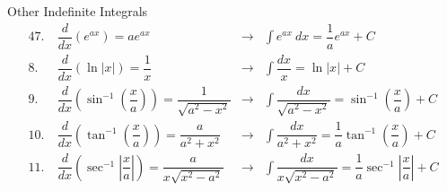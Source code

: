\documentclass[cal1spr16Lectures.tex]{subfiles}
\begin{document}
\begin{frame}{\small Other Indefinite Integrals}\footnotesize
\begin{alignat*}{4}
7.\ &\dfrac{d}{dx} (e^{ax}) = a e^{ax} &\longrightarrow &\int e^{ax}\ dx = \dfrac{1}{a} e^{ax} + C \\
8.\ &\dfrac{d}{dx} (\ln |x|) = \dfrac{1}{x} &\longrightarrow &\int \dfrac{dx}{x} = \ln |x| + C \\
9.\ &\dfrac{d}{dx} \left( \sin^{-1} \left( \dfrac{x}{a} \right) \right) = \dfrac{1}{\sqrt{a^2-x^2}} &\longrightarrow 
&\int \dfrac{dx}{\sqrt{a^2-x^2}} = \sin^{-1} \left( \dfrac{x}{a} \right) + C \\
10.\ &\dfrac{d}{dx} \left( \tan^{-1} \left( \dfrac{x}{a} \right) \right) = \dfrac{a}{a^2+x^2} &\longrightarrow 
&\int \dfrac{dx}{a^2+x^2} = \dfrac{1}{a} \tan^{-1} \left( \dfrac{x}{a} \right) + C \\
11.\ &\dfrac{d}{dx} \left( \sec^{-1} \left| \dfrac{x}{a} \right| \right) = \dfrac{a}{x \sqrt{x^2-a^2}} &\longrightarrow 
&\int \dfrac{dx}{x \sqrt{x^2-a^2}} = \dfrac{1}{a} \sec^{-1} \left| \dfrac{x}{a} \right| + C
\end{alignat*}
\end{frame}
\end{document}
